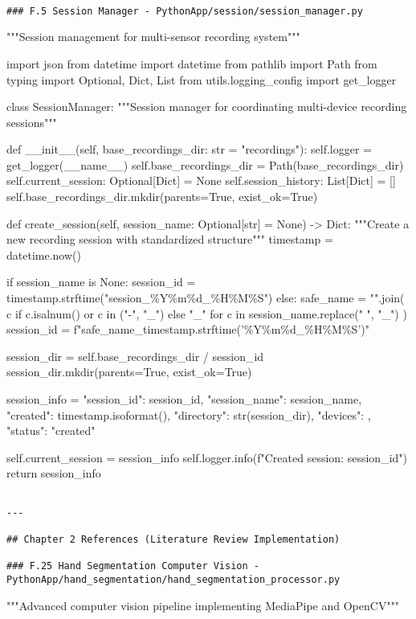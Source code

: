 \documentclass[11pt,a4paper]{report}
\begin{document}
\begin{verbatim}

### F.5 Session Manager - PythonApp/session/session_manager.py

\end{verbatim}
"""Session management for multi-sensor recording system"""

import json
from datetime import datetime
from pathlib import Path
from typing import Optional, Dict, List
from utils.logging\_config import get\_logger


class SessionManager:
    """Session manager for coordinating multi-device recording sessions"""

    def \_\_init\_\_(self, base\_recordings\_dir: str = "recordings"):
        self.logger = get\_logger(\_\_name\_\_)
        self.base\_recordings\_dir = Path(base\_recordings\_dir)
        self.current\_session: Optional[Dict] = None
        self.session\_history: List[Dict] = []
        self.base\_recordings\_dir.mkdir(parents=True, exist\_ok=True)

    def create\_session(self, session\_name: Optional[str] = None) -> Dict:
        """Create a new recording session with standardized structure"""
        timestamp = datetime.now()

        if session\_name is None:
            session\_id = timestamp.strftime("session\_\%Y\%m\%d\_\%H\%M\%S")
        else:
            safe\_name = "".join(
                c if c.isalnum() or c in ("-", "\_") else "\_"
                for c in session\_name.replace(" ", "\_")
            )
            session\_id = f"{safe\_name}\_{timestamp.strftime('\%Y\%m\%d\_\%H\%M\%S')}"

        session\_dir = self.base\_recordings\_dir / session\_id
        session\_dir.mkdir(parents=True, exist\_ok=True)

        session\_info = {
            "session\_id": session\_id,
            "session\_name": session\_name,
            "created": timestamp.isoformat(),
            "directory": str(session\_dir),
            "devices": {},
            "status": "created"
        }

        self.current\_session = session\_info
        self.logger.info(f"Created session: {session\_id}")
        return session\_info
\begin{verbatim}

---

## Chapter 2 References (Literature Review Implementation)

### F.25 Hand Segmentation Computer Vision - PythonApp/hand_segmentation/hand_segmentation_processor.py

\end{verbatim}
"""Advanced computer vision pipeline implementing MediaPipe and OpenCV"""
\end{document}
